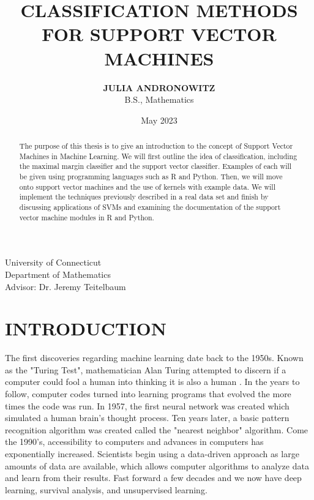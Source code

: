 \documentclass[12pt]{article}
\title{\textbf{CLASSIFICATION METHODS FOR SUPPORT VECTOR MACHINES}}
\author{\textbf{JULIA ANDRONOWITZ} \\ B.S., Mathematics}
\date{May 2023}
\begin{document}
\maketitle
\thispagestyle{empty}

\begin{adjustwidth}{0.5in}{0.5in}
\begin{abstract}
    The purpose of this thesis is to give an introduction to the concept of Support Vector Machines in Machine Learning. We will first outline the idea of classification, including the maximal margin classifier and the support vector classifier. Examples of each will be given using programming languages such as R and Python. Then, we will move onto support vector machines and the use of kernels with example data. We will implement the techniques previously described in a real data set and finish by discussing applications of SVMs and examining the documentation of the support vector machine modules in R and Python.
\end{abstract}
\end{adjustwidth}

\vfill

\begin{center}
    University of Connecticut \\ Department of Mathematics \\ Advisor: Dr. Jeremy Teitelbaum
\end{center}

\newpage

\section{INTRODUCTION}

The first discoveries regarding machine learning date back to the 1950s. Known as the "Turing Test", mathematician Alan Turing attempted to discern if a computer could fool a human into thinking it is also a human \cite{mlhistory}. In the years to follow, computer codes turned into learning programs that evolved the more times the code was run. In 1957, the first neural network was created which simulated a human brain's thought process. Ten years later, a basic pattern recognition algorithm was created called the "nearest neighbor" algorithm. Come the 1990's, accessibility to computers and advances in computers has exponentially increased. Scientists begin using a data-driven approach as large amounts of data are available, which allows computer algorithms to analyze data and learn from their results. Fast forward a few decades and we now have deep learning, survival analysis, and unsupervised learning.
\end{document}
